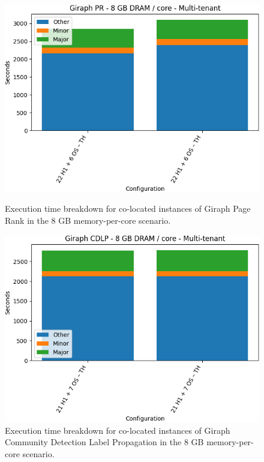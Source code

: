 \begin{figure}[thbp]
        \centering
    \includegraphics[width=\linewidth]{./fig/g_pr64.png}
    \caption{Execution time breakdown for co-located instances of Giraph
    Page Rank in the 8 GB memory-per-core scenario.}
    \label{fig:g_pr64}
    \includegraphics[width=\linewidth]{./fig/g_cdlp64.png}
    \caption{Execution time breakdown for co-located instances of Giraph
    Community Detection Label Propagation in the 8 GB memory-per-core scenario.}
    \label{fig:g_cdlp64}
\end{figure}

